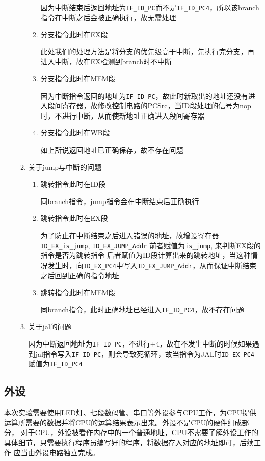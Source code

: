 \documentclass{ctexart}
\begin{document}
\begin{enumerate}
\begin{enumerate}
\begin{enumerate}
因为中断结束后返回地址为\verb"IF_ID_PC"而不是\verb"IF_ID_PC4"，所以该branch指令在中断之后会被正确执行，故无需处理

\item 分支指令此时在EX段

此处我们的处理方法是将分支的优先级高于中断，先执行完分支，再进入中断，故在EX检测到branch时不中断

\item 分支指令此时在MEM段

因为中断指令返回的地址为\verb"IF_ID_PC"，故此时新取出的地址还没有进入段间寄存器，故修改控制电路的PCSrc，当ID段处理的信号为nop时，不进行中断，从而使新地址正确进入段间寄存器

\item 分支指令此时在WB段

如上所说返回地址已正确保存，故不存在问题
\end{enumerate}

\item 关于jump与中断的问题

\begin{enumerate}
\item 跳转指令此时在ID段

同branch指令，jump指令会在中断结束后正确执行

\item 跳转指令此时在EX段

为了防止在中断结束之后进入错误的地址，故增设寄存器\verb"ID_EX_is_jump", \verb"ID_EX_JUMP_Addr"
前者赋值为\verb"is_jump", 来判断EX段的指令是否为跳转指令
后者赋值为ID段计算出来的跳转地址，当这种情况发生时，向\verb"ID_EX_PC4"中写入\verb"ID_EX_JUMP_Addr"，从而保证中断结束之后回到正确的指令地址

\item 跳转指令此时在MEM段

同branch指令，此时正确地址已经进入\verb"IF_ID_PC4"，故不存在问题
\end{enumerate}

\item 关于jal的问题

因为中断返回地址为\verb"IF_ID_PC"，不进行+4，故在不发生中断的时候如果遇到jal指令写入\verb"IF_ID_PC"，则会导致死循环，故当指令为JAL时\verb"ID_EX_PC4"赋值为\verb"IF_ID_PC4"


\end{enumerate}


		\end{enumerate}

		\subsection{外设}
		本次实验需要使用LED灯、七段数码管、串口等外设参与CPU工作，为CPU提供运算所需要的数据并将CPU的运算结果表示出来。外设不是CPU的硬件组成部分，
		对于CPU，外设被看作内存中的一个普通地址，CPU不需要了解外设工作的具体细节，只需要执行程序员编写好的程序，将数据存入对应的地址即可，后续工作
		应当由外设电路独立完成。
\end{document}
